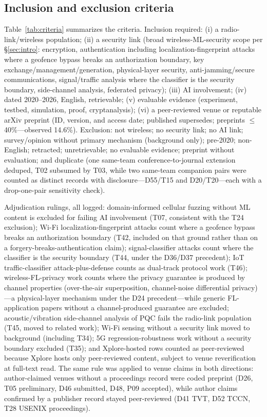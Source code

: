 \subsection{Inclusion and exclusion criteria}
Table~\ref{tab:criteria} summarizes the criteria. Inclusion required: (i) a radio-link/wireless population; (ii) a security link (broad wireless-ML-security scope per \S\ref{sec:intro}: encryption, authentication including localization-fingerprint attacks where a geofence bypass breaks an authorization boundary, key exchange/management/generation, physical-layer security, anti-jamming/secure communications, signal/traffic analysis where the classifier is the security boundary, side-channel analysis, federated privacy); (iii) AI involvement; (iv) dated 2020--2026, English, retrievable; (v) evaluable evidence (experiment, testbed, simulation, proof, cryptanalysis); (vi) a peer-reviewed venue or reputable arXiv preprint (ID, version, and access date; published supersedes; preprints $\le$40\%---observed 14.6\%). Exclusion: not wireless; no security link; no AI link; survey/opinion without primary mechanism (background only); pre-2020; non-English; retracted; unretrievable; no evaluable evidence; preprint without evaluation; and duplicate (one same-team conference-to-journal extension deduped, T02 subsumed by T03, while two same-team companion pairs were counted as distinct records with disclosure---D55/T15 and D20/T20---each with a drop-one-pair sensitivity check).

Adjudication rulings, all logged: domain-informed cellular fuzzing without ML content is excluded for failing AI involvement (T07, consistent with the T24 exclusion); Wi-Fi localization-fingerprint attacks count where a geofence bypass breaks an authorization boundary (T42, included on that ground rather than on a forgery-breaks-authentication claim); signal-classifier attacks count where the classifier is the security boundary (T44, under the D36/D37 precedent); IoT traffic-classifier attack-plus-defense counts as dual-track protocol work (T46); wireless-FL-privacy work counts where the privacy guarantee is produced by channel properties (over-the-air superposition, channel-noise differential privacy)---a physical-layer mechanism under the D24 precedent---while generic FL-application papers without a channel-produced guarantee are excluded; acoustic/vibration side-channel analysis of PQC fails the radio-link population (T45, moved to related work); Wi-Fi sensing without a security link moved to background (including T34); 5G regression-robustness work without a security boundary excluded (T35); and Xplore-hosted rows counted as peer-reviewed because Xplore hosts only peer-reviewed content, subject to venue reverification at full-text read. The same rule was applied to venue claims in both directions: author-claimed venues without a proceedings record were coded preprint (D26, T05 preliminary, D46 submitted, D48, P09 accepted), while author claims confirmed by a publisher record stayed peer-reviewed (D41 TVT, D52 TCCN, T28 USENIX proceedings).

